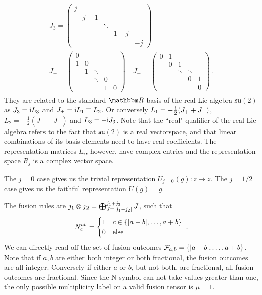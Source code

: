\begin{gather}
    \begin{gathered}
    J_3 = \begin{pmatrix}
        j & & & & \\
        & j - 1 & & & \\
        & & \ddots & & \\
        & & & 1 - j & \\
        & & & & -j
    \end{pmatrix}
    \\
    J_+ = \begin{pmatrix}
        0 & & & & \\
        1 & 0 & & & \\
        & 1 & \ddots & & \\
        & & \ddots & 0 & \\
        & & & 1 & 0
    \end{pmatrix}
    \quad
    J_+ = \begin{pmatrix}
        0 & 1 & & & \\
        & 0 & 1 & & \\
        & & \ddots & \ddots & \\
        & & & 0 & 1 \\
        & & & & 0
    \end{pmatrix}
    ~.
    \end{gathered}
\end{gather}
%
They are related to the standard $\Rbb$-basis of the real Lie algebra $\mathfrak{su}(2)$ as $J_3 = \mathrm{i} L_3$ and $J_\pm = \mathrm{i} L_1 \mp L_2$.
%
Or conversely $L_1 = -\tfrac{\mathrm{i}}{2} (J_+ + J_-)$, $L_2 = -\tfrac{1}{2} (J_+ - J_-)$ and $L_3 = -\mathrm{i} J_3$.
%
Note that the ``real" qualifier of the real Lie algebra refers to the fact that $\mathfrak{su}(2)$ is a real vectorspace, and that linear combinations of its basis elements need to have real coefficients. The representation matrices $L_i$, however, have complex entries and the representation space $R_j$ is a complex vector space.

The $j=0$ case gives us the trivial representation $U_{j=0}(g) : z \mapsto z$.
%
The $j=1/2$ case gives us the faithful representation $U(g) = g$.

The fusion rules are $j_1 \otimes j_2 = \bigoplus_{J=\abs{j_1 - j_2}}^{j_1 + j_2} J$, such that 
\begin{equation}
    N^{ab}_c = \begin{cases}
        1 & c \in\set{\abs{a - b}, \dots, a + b} \\
        0 & \text{else}
    \end{cases}
    ~.
\end{equation}
%
We can directly read off the set of fusion outcomes $\mathcal{F}_{a,b} = \set{\abs{a - b}, \dots, a + b}$.
%
Note that if $a, b$ are either both integer or both fractional, the fusion outcomes are all integer.
%
Conversely if either $a$ or $b$, but not both, are fractional, all fusion outcomes are fractional.
%
Since the N symbol can not take values greater than one, the only possible multiplicity label on a valid fusion tensor is $\mu=1$.

